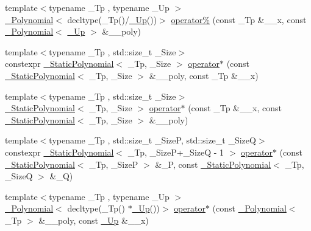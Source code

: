 \begin{DoxyCompactItemize}
\item 
{\footnotesize template$<$typename \+\_\+\+Tp , typename \+\_\+\+Up $>$ }\\\hyperlink{class____gnu__cxx_1_1__Polynomial}{\+\_\+\+Polynomial}$<$ decltype(\+\_\+\+Tp()/\hyperlink{namespace____gnu__cxx_ab693ea357b6429b331e0bf09f9442385}{\+\_\+\+Up}())$>$ \hyperlink{namespace____gnu__cxx_a2d1e6cb96943b2c99f71cf77a7247e77}{operator\%} (const \+\_\+\+Tp \&\+\_\+\+\_\+x, const \hyperlink{class____gnu__cxx_1_1__Polynomial}{\+\_\+\+Polynomial}$<$ \hyperlink{namespace____gnu__cxx_ab693ea357b6429b331e0bf09f9442385}{\+\_\+\+Up} $>$ \&\+\_\+\+\_\+poly)
\item 
{\footnotesize template$<$typename \+\_\+\+Tp , std\+::size\+\_\+t \+\_\+\+Size$>$ }\\constexpr \hyperlink{class____gnu__cxx_1_1__StaticPolynomial}{\+\_\+\+Static\+Polynomial}$<$ \+\_\+\+Tp, \+\_\+\+Size $>$ \hyperlink{namespace____gnu__cxx_a71781c23f8dd75f9cf9d7610a26225ad}{operator$\ast$} (const \hyperlink{class____gnu__cxx_1_1__StaticPolynomial}{\+\_\+\+Static\+Polynomial}$<$ \+\_\+\+Tp, \+\_\+\+Size $>$ \&\+\_\+\+\_\+poly, const \+\_\+\+Tp \&\+\_\+\+\_\+x)
\item 
{\footnotesize template$<$typename \+\_\+\+Tp , std\+::size\+\_\+t \+\_\+\+Size$>$ }\\\hyperlink{class____gnu__cxx_1_1__StaticPolynomial}{\+\_\+\+Static\+Polynomial}$<$ \+\_\+\+Tp, \+\_\+\+Size $>$ \hyperlink{namespace____gnu__cxx_a91cea4290bb3218fc6d869a655db5891}{operator$\ast$} (const \+\_\+\+Tp \&\+\_\+\+\_\+x, const \hyperlink{class____gnu__cxx_1_1__StaticPolynomial}{\+\_\+\+Static\+Polynomial}$<$ \+\_\+\+Tp, \+\_\+\+Size $>$ \&\+\_\+\+\_\+poly)
\item 
{\footnotesize template$<$typename \+\_\+\+Tp , std\+::size\+\_\+t \+\_\+\+SizeP, std\+::size\+\_\+t \+\_\+\+SizeQ$>$ }\\constexpr \hyperlink{class____gnu__cxx_1_1__StaticPolynomial}{\+\_\+\+Static\+Polynomial}$<$ \+\_\+\+Tp, \+\_\+\+SizeP+\+\_\+\+SizeQ -\/ 1 $>$ \hyperlink{namespace____gnu__cxx_a8570f2d82260e7f64d985be3ddf007f8}{operator$\ast$} (const \hyperlink{class____gnu__cxx_1_1__StaticPolynomial}{\+\_\+\+Static\+Polynomial}$<$ \+\_\+\+Tp, \+\_\+\+SizeP $>$ \&\+\_\+P, const \hyperlink{class____gnu__cxx_1_1__StaticPolynomial}{\+\_\+\+Static\+Polynomial}$<$ \+\_\+\+Tp, \+\_\+\+SizeQ $>$ \&\+\_\+Q)
\item 
{\footnotesize template$<$typename \+\_\+\+Tp , typename \+\_\+\+Up $>$ }\\\hyperlink{class____gnu__cxx_1_1__Polynomial}{\+\_\+\+Polynomial}$<$ decltype(\+\_\+\+Tp() $\ast$\hyperlink{namespace____gnu__cxx_ab693ea357b6429b331e0bf09f9442385}{\+\_\+\+Up}())$>$ \hyperlink{namespace____gnu__cxx_a1d0b1e9322fd407848b43cecab1ab9ae}{operator$\ast$} (const \hyperlink{class____gnu__cxx_1_1__Polynomial}{\+\_\+\+Polynomial}$<$ \+\_\+\+Tp $>$ \&\+\_\+\+\_\+poly, const \hyperlink{namespace____gnu__cxx_ab693ea357b6429b331e0bf09f9442385}{\+\_\+\+Up} \&\+\_\+\+\_\+x)

\end{DoxyCompactItemize}
